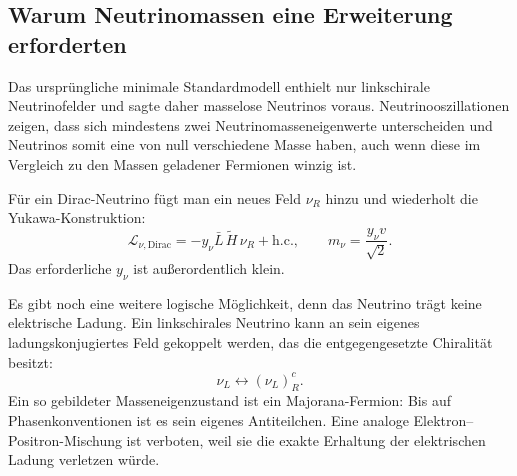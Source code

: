 \subsection{Warum Neutrinomassen eine Erweiterung erforderten}

Das ursprüngliche minimale Standardmodell enthielt nur linkschirale Neutrinofelder und sagte daher masselose Neutrinos voraus. Neutrinooszillationen zeigen, dass sich mindestens zwei Neutrinomasseneigenwerte unterscheiden und Neutrinos somit eine von null verschiedene Masse haben, auch wenn diese im Vergleich zu den Massen geladener Fermionen winzig ist.

\begin{classroomqa}
\end{classroomqa}

Für ein Dirac-Neutrino fügt man ein neues Feld \(\nu_R\) hinzu und wiederholt die Yukawa-Konstruktion:
\begin{equation}
  \mathcal L_{\nu,\mathrm{Dirac}}
  =-y_\nu\bar L\,\widetilde H\,\nu_R+\mathrm{h.c.},
  \qquad
  m_\nu=\frac{y_\nu v}{\sqrt2}.
  \label{eq:l09-dirac-neutrino}
\end{equation}
Das erforderliche \(y_\nu\) ist außerordentlich klein.

Es gibt noch eine weitere logische Möglichkeit, denn das Neutrino trägt keine elektrische Ladung. Ein linkschirales Neutrino kann an sein eigenes ladungskonjugiertes Feld gekoppelt werden, das die entgegengesetzte Chiralität besitzt:
\begin{equation}
  \nu_L\longleftrightarrow(\nu_L)^c_R .
  \label{eq:l09-majorana-mixing}
\end{equation}
Ein so gebildeter Masseneigenzustand ist ein Majorana-Fermion: Bis auf Phasenkonventionen ist es sein eigenes Antiteilchen. Eine analoge Elektron--Positron-Mischung ist verboten, weil sie die exakte Erhaltung der elektrischen Ladung verletzen würde.

\begin{classroomqa}
\end{classroomqa}

